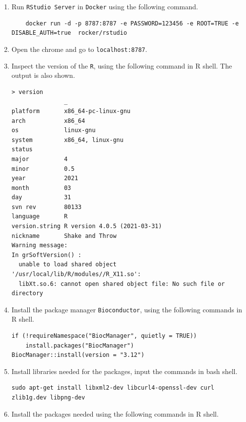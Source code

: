 \documentclass[en,black,12pt,normal]{elegantnote}
\begin{document}
\begin{enumerate}
    \item Run \lstinline{RStudio Server} in \lstinline{Docker} using the following command.
    \begin{lstlisting}
    docker run -d -p 8787:8787 -e PASSWORD=123456 -e ROOT=TRUE -e DISABLE_AUTH=true  rocker/rstudio
    \end{lstlisting}
    \item Open the chrome and go to \lstinline{localhost:8787}.
    \item Inspect the version of the \lstinline{R}, using the following command in R shell. The output is also shown.
    \begin{lstlisting}
> version
               _                           
platform       x86_64-pc-linux-gnu         
arch           x86_64                      
os             linux-gnu                   
system         x86_64, linux-gnu           
status                                     
major          4                           
minor          0.5                         
year           2021                        
month          03                          
day            31                          
svn rev        80133                       
language       R                           
version.string R version 4.0.5 (2021-03-31)
nickname       Shake and Throw             
Warning message:
In grSoftVersion() :
  unable to load shared object '/usr/local/lib/R/modules//R_X11.so':
  libXt.so.6: cannot open shared object file: No such file or directory
    \end{lstlisting}
    \item Install the package manager \lstinline{Bioconductor}, using the following commands in R shell.
    
    \begin{lstlisting}
if (!requireNamespace("BiocManager", quietly = TRUE))
    install.packages("BiocManager")
BiocManager::install(version = "3.12")
    \end{lstlisting}
    \item Install libraries needed for the packages, input the commands in bash shell.
    
    \begin{lstlisting}
sudo apt-get install libxml2-dev libcurl4-openssl-dev curl zlib1g.dev libpng-dev
    \end{lstlisting}    
    \item Install the packages needed using the following commands in R shell.
    

\end{enumerate}
\end{document}
